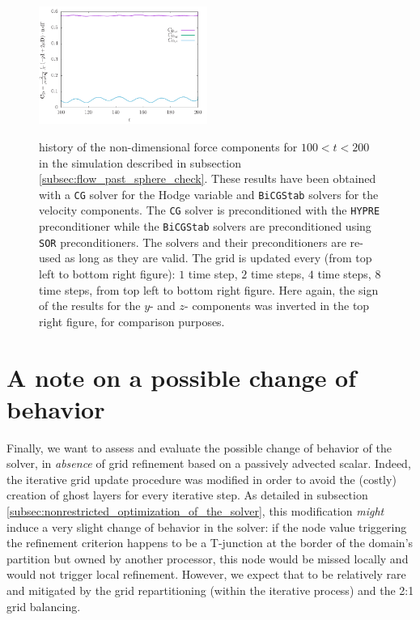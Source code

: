 \documentclass[11pt, a4paper]{article}
\theoremstyle{remark}
\begin{document}
\begin{figure}
  \includegraphics[width=0.49\textwidth]{./results/flow_past_sphere_smoke/optimized_run_reused_solvers_cg_and_pchypre/grid_update_8/force_history.pdf} \\
 \caption{\label{fig:forces_flow_past_sphere_reused_solvers_cg_and_hypre} history of the non-dimensional force components for $100 < t < 200$ in the simulation described in subsection \ref{subsec:flow_past_sphere_check}. These results have been obtained with a \texttt{CG} solver for the Hodge variable and \texttt{BiCGStab} solvers for the velocity components. The \texttt{CG} solver is preconditioned with the \texttt{HYPRE} preconditioner while the \texttt{BiCGStab} solvers are preconditioned using \texttt{SOR} preconditioners. The solvers and their preconditioners are re-used as long as they are valid. The grid is updated every (from top left to bottom right figure): $1$ time step, $2$ time steps, $4$ time steps, $8$ time steps, from top left to bottom right figure. Here again, the sign of the results for the $y$- and $z$- components was inverted in the top right figure, for comparison purposes.} 
\end{figure} 


\section{A note on a possible change of behavior}

Finally, we want to assess and evaluate the possible change of behavior of the solver, in \emph{absence} of grid refinement based on a passively advected scalar. Indeed, the iterative grid update procedure was modified in order to avoid the (costly) creation of ghost layers for every iterative step. As detailed in subsection \ref{subsec:nonrestricted_optimization_of_the_solver}, this modification \emph{might} induce a very slight change of behavior in the solver: if the node value triggering the refinement criterion happens to be a T-junction at the border of the domain's partition but owned by another processor, this node would be missed locally and would not trigger local refinement. However, we expect that to be relatively rare and mitigated by the grid repartitioning (within the iterative process) and the 2:1 grid balancing.
\end{document}
